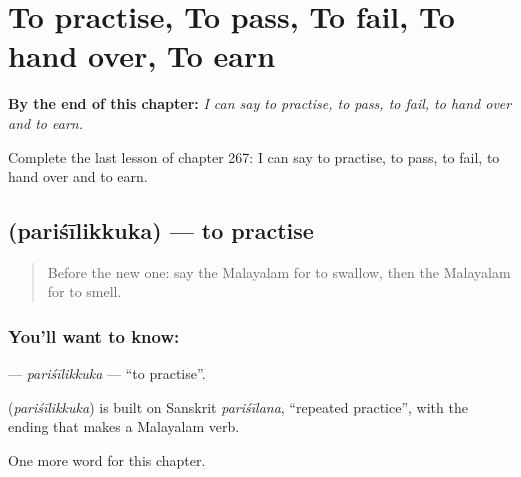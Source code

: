 
\chapter{To practise, To pass, To fail, To hand over, To earn}
\label{ch:ml-to-practise-to-pass-to-fail-to-hand-over-to-earn}

\begin{chapteropening}
\textbf{By the end of this chapter:} \emph{I can say to practise, to pass, to fail, to hand over and to earn.}

Complete the last lesson of chapter 267: I can say to practise, to pass, to fail, to hand over and to earn.
\end{chapteropening}

\section[\texorpdfstring{\ml{പരിശീലിക്കുക} (pariśīlikkuka)}{പരിശീലിക്കുക (pariśīlikkuka)}]{ (pariśīlikkuka) — to practise}

\label{lesson:ML-C267-parisilikkuka}



\begin{quote}
Before the new one: say the Malayalam for to swallow, then the Malayalam for to smell.
\end{quote}

\subsection*{You'll want to know: }
\textbf{} — \emph{pariśīlikkuka} — \textquotedblleft{}to practise\textquotedblright{}.

\begin{cousinweb}
\textbf{} (\emph{pariśīlikkuka}) is built on Sanskrit \emph{pariśīlana}, \textquotedblleft{}repeated practice\textquotedblright{}, with the ending that makes a Malayalam verb.
\end{cousinweb}

\begin{grammarlens}[title={What you've built}]
One more word for this chapter.
\end{grammarlens}

